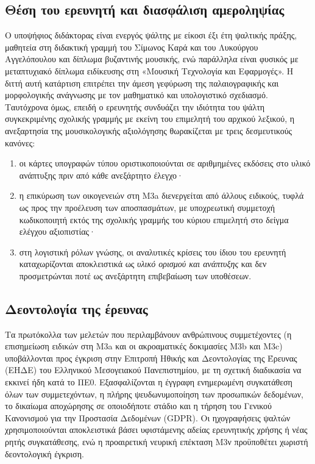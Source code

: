 \documentclass[11pt,a4paper]{article}
\begin{document}
\subsection{Θέση του ερευνητή και διασφάλιση αμεροληψίας}\label{ux3b8ux3adux3c3ux3b7-ux3c4ux3bfux3c5-ux3b5ux3c1ux3b5ux3c5ux3bdux3b7ux3c4ux3ae-ux3baux3b1ux3b9-ux3b4ux3b9ux3b1ux3c3ux3c6ux3acux3bbux3b9ux3c3ux3b7-ux3b1ux3bcux3b5ux3c1ux3bfux3bbux3b7ux3c8ux3afux3b1ux3c2}

Ο υποψήφιος διδάκτορας είναι ενεργός ψάλτης με είκοσι έξι έτη ψαλτικής πράξης, μαθητεία στη διδακτική γραμμή του Σίμωνος Καρά και του Λυκούργου Αγγελόπουλου και δίπλωμα βυζαντινής μουσικής, ενώ παράλληλα είναι φυσικός με μεταπτυχιακό δίπλωμα ειδίκευσης στη «Μουσική Τεχνολογία και Εφαρμογές». Η διττή αυτή κατάρτιση επιτρέπει την άμεση γεφύρωση της παλαιογραφικής και μορφολογικής ανάγνωσης με τον μαθηματικό και υπολογιστικό σχεδιασμό. Ταυτόχρονα όμως, επειδή ο ερευνητής συνδυάζει την ιδιότητα του ψάλτη συγκεκριμένης σχολικής γραμμής με εκείνη του επιμελητή του αρχικού λεξικού, η ανεξαρτησία της μουσικολογικής αξιολόγησης θωρακίζεται με τρεις δεσμευτικούς κανόνες:

\begin{enumerate}
\def\labelenumi{\arabic{enumi}.}
\item
  οι κάρτες υπογραφών τύπου οριστικοποιούνται σε αριθμημένες εκδόσεις στο υλικό ανάπτυξης πριν από κάθε ανεξάρτητο έλεγχο·
\item
  η επικύρωση των οικογενειών στη Μ3a διενεργείται από άλλους ειδικούς, τυφλά ως προς την προέλευση των αποσπασμάτων, με υποχρεωτική συμμετοχή κωδικοποιητή εκτός της σχολικής γραμμής του κύριου επιμελητή στο δείγμα ελέγχου αξιοπιστίας·
\item
  στη λογιστική ρόλων γνώσης, οι αναλυτικές κρίσεις του ίδιου του ερευνητή καταχωρίζονται αποκλειστικά ως \emph{υλικό ορισμού και ανάπτυξης} και δεν προσμετρώνται ποτέ ως ανεξάρτητη επιβεβαίωση των υποθέσεων.
\end{enumerate}

\subsection{Δεοντολογία της έρευνας}\label{ux3b4ux3b5ux3bfux3bdux3c4ux3bfux3bbux3bfux3b3ux3afux3b1-ux3c4ux3b7ux3c2-ux3adux3c1ux3b5ux3c5ux3bdux3b1ux3c2}

Τα πρωτόκολλα των μελετών που περιλαμβάνουν ανθρώπινους συμμετέχοντες (η επισημείωση ειδικών στη Μ3a και οι ακροαματικές δοκιμασίες Μ3b και Μ3c) υποβάλλονται προς έγκριση στην Επιτροπή Ηθικής και Δεοντολογίας της Έρευνας (ΕΗΔΕ) του Ελληνικού Μεσογειακού Πανεπιστημίου, με τη σχετική διαδικασία να εκκινεί ήδη κατά το ΠΕ0. Εξασφαλίζονται η έγγραφη ενημερωμένη συγκατάθεση όλων των συμμετεχόντων, η πλήρης ψευδωνυμοποίηση των προσωπικών δεδομένων, το δικαίωμα αποχώρησης σε οποιοδήποτε στάδιο και η τήρηση του Γενικού Κανονισμού για την Προστασία Δεδομένων (GDPR). Οι ηχογραφήσεις ψαλτών χρησιμοποιούνται αποκλειστικά βάσει υφιστάμενης αδείας ερευνητικής χρήσης ή νέας ρητής συγκατάθεσης, ενώ η προαιρετική νευρική επέκταση Μ3ν προϋποθέτει χωριστή δεοντολογική έγκριση.
\end{document}
